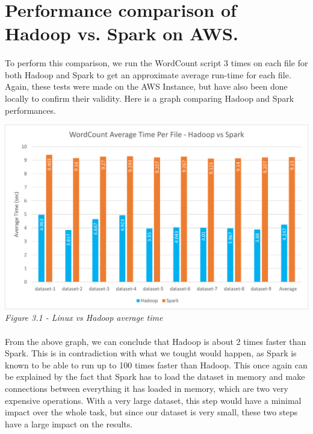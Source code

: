 \pagebreak
\section{Performance comparison of Hadoop vs. Spark on AWS.} \label{T3}
\paragraph{}To perform this comparison, we run the WordCount script 3 times on each file for both Hadoop and Spark to get an approximate average run-time for each file. Again, these tests were made on the AWS Instance, but have also been done locally to confirm their validity. Here is a graph comparing Hadoop and Spark performances.\\
\begin{center}
\includegraphics[width=14cm]{Resources/hadoop_vs_spark.png}\\
\emph{Figure 3.1 - Linux vs Hadoop average time}
\end{center}
\paragraph{}From the above graph, we can conclude that Hadoop is about 2 times faster than Spark. This is in contradiction with what we tought would happen, as Spark is known to be able to run up to 100 times faster than Hadoop. This once again can be explained by the fact that Spark has to load the dataset in memory and make connections between everything it has loaded in memory, which are two very expensive operations. With a very large dataset, this step would have a minimal impact over the whole task, but since our dataset is very small, these two steps have a large impact on the results.